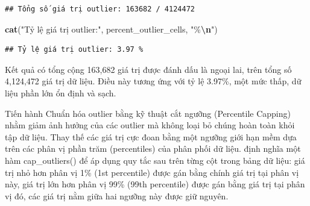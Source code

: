 \documentclass[
]{article}
\newenvironment{Shaded}{\begin{snugshade}}{\end{snugshade}}
\newcommand{\FunctionTok}[1]{\textcolor[rgb]{0.13,0.29,0.53}{\textbf{#1}}}
\newcommand{\NormalTok}[1]{#1}
\newcommand{\SpecialCharTok}[1]{\textcolor[rgb]{0.81,0.36,0.00}{\textbf{#1}}}
\newcommand{\StringTok}[1]{\textcolor[rgb]{0.31,0.60,0.02}{#1}}
\begin{document}
\begin{verbatim}
## Tổng số giá trị outlier: 163682 / 4124472
\end{verbatim}

\begin{Shaded}
\begin{Highlighting}[]
\FunctionTok{cat}\NormalTok{(}\StringTok{"Tỷ lệ giá trị outlier:"}\NormalTok{, percent\_outlier\_cells, }\StringTok{"\%}\SpecialCharTok{\textbackslash{}n}\StringTok{"}\NormalTok{)}
\end{Highlighting}
\end{Shaded}

\begin{verbatim}
## Tỷ lệ giá trị outlier: 3.97 %
\end{verbatim}

Kết quả có tổng cộng 163,682 giá trị được đánh dấu là ngoại lai, trên
tổng số 4,124,472 giá trị dữ liệu. Điều này tương ứng với tỷ lệ 3.97\%,
một mức thấp, dữ liệu phần lớn ổn định và sạch.

Tiến hành Chuẩn hóa outlier bằng kỹ thuật cắt ngưỡng (Percentile
Capping) nhằm giảm ảnh hưởng của các outlier mà không loại bỏ chúng hoàn
toàn khỏi tập dữ liệu. Thay thế các giá trị cực đoan bằng một ngưỡng
giới hạn mềm dựa trên các phân vị phần trăm (percentiles) của phân phối
dữ liệu. định nghĩa một hàm cap\_outliers() để áp dụng quy tắc sau trên
từng cột trong bảng dữ liệu: giá trị nhỏ hơn phân vị 1\% (1st
percentile) được gán bằng chính giá trị tại phân vị này, giá trị lớn hơn
phân vị 99\% (99th percentile) được gán bằng giá trị tại phân vị đó, các
giá trị nằm giữa hai ngưỡng này được giữ nguyên.
\end{document}
